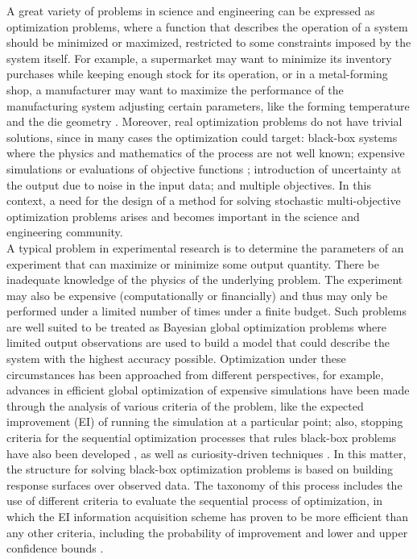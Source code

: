 \documentclass{article}
\begin{document}
A great variety of problems in science and engineering can be expressed as optimization problems, where a function that describes the operation of a system should be minimized or maximized, restricted to some constraints imposed by the system itself. For example, a supermarket may want to minimize its inventory purchases while keeping enough stock for its operation, or in a metal-forming shop, a manufacturer may want to maximize the performance of the manufacturing system adjusting certain parameters, like the forming temperature and the die geometry \cite{Huang2006}. Moreover, real optimization problems do not have trivial solutions, since in many cases the optimization could target: black-box systems where the physics and mathematics of the process are not well known; expensive simulations or evaluations of objective functions \cite{Jones1998}; introduction of uncertainty at the output due to noise in the input data; and multiple objectives. In this context, a need for the design of a method for solving stochastic multi-objective optimization problems arises and becomes important in the science and engineering community.\\

A typical problem in experimental research is to determine the parameters of an experiment that can maximize or minimize some output quantity. There be inadequate knowledge of the physics of the underlying problem. The experiment may also be expensive (computationally or financially) and thus may only be performed under a limited number of times under a finite budget. Such problems are well suited to be treated as Bayesian global optimization problems where limited output observations are used to build a model that could describe the system with the highest accuracy possible. Optimization under these circumstances has been approached from different perspectives, for example, advances in efficient global optimization of expensive simulations have been made through the analysis of various criteria of the problem, like the expected improvement (EI) of running the simulation at a particular point; also, stopping criteria for the sequential optimization processes that rules black-box problems have also been developed \cite{Jones1998}, as well as curiosity-driven techniques \cite{Schaul2011}. In this matter, the structure for solving black-box optimization problems is based on building response surfaces over observed data. The taxonomy of this process includes the use of different criteria to evaluate the sequential process of optimization, in which the EI information acquisition scheme has proven to be more efficient than any other criteria, including the probability of improvement and lower and upper confidence bounds \cite{Jones2001}.\\
\end{document}
